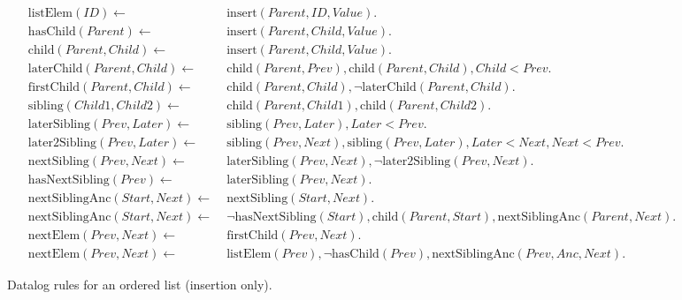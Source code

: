 \documentclass[twocolumn,10pt]{article}
\begin{document}
\begin{figure*}
\begin{align*}
    \mathrm{listElem}(\mathit{ID}) \leftarrow\; &
    \mathrm{insert}(\mathit{Parent}, \mathit{ID}, \mathit{Value}).
\\
    \mathrm{hasChild}(\mathit{Parent}) \leftarrow\; &
    \mathrm{insert}(\mathit{Parent}, \mathit{Child}, \mathit{Value}).
\\
    \mathrm{child}(\mathit{Parent}, \mathit{Child}) \leftarrow\; &
    \mathrm{insert}(\mathit{Parent}, \mathit{Child}, \mathit{Value}).
\\
    \mathrm{laterChild}(\mathit{Parent}, \mathit{Child}) \leftarrow\; &
    \mathrm{child}(\mathit{Parent}, \mathit{Prev}),
    \mathrm{child}(\mathit{Parent}, \mathit{Child}),
    \mathit{Child} < \mathit{Prev}.
\\
    \mathrm{firstChild}(\mathit{Parent}, \mathit{Child}) \leftarrow\; &
    \mathrm{child}(\mathit{Parent}, \mathit{Child}),
    \neg\mathrm{laterChild}(\mathit{Parent}, \mathit{Child}).
\\
    \mathrm{sibling}(\mathit{Child1}, \mathit{Child2}) \leftarrow\; &
    \mathrm{child}(\mathit{Parent}, \mathit{Child1}),
    \mathrm{child}(\mathit{Parent}, \mathit{Child2}).
\\
    \mathrm{laterSibling}(\mathit{Prev}, \mathit{Later}) \leftarrow\; &
    \mathrm{sibling}(\mathit{Prev}, \mathit{Later}),
    \mathit{Later} < \mathit{Prev}.
\\
    \mathrm{later2Sibling}(\mathit{Prev}, \mathit{Later}) \leftarrow\; &
    \mathrm{sibling}(\mathit{Prev}, \mathit{Next}),
    \mathrm{sibling}(\mathit{Prev}, \mathit{Later}),
    \mathit{Later} < \mathit{Next},
    \mathit{Next} < \mathit{Prev}.
\\
    \mathrm{nextSibling}(\mathit{Prev}, \mathit{Next}) \leftarrow\; &
    \mathrm{laterSibling}(\mathit{Prev}, \mathit{Next}),
    \neg\mathrm{later2Sibling}(\mathit{Prev}, \mathit{Next}).
\\
    \mathrm{hasNextSibling}(\mathit{Prev}) \leftarrow\; &
    \mathrm{laterSibling}(\mathit{Prev}, \mathit{Next}).
\\
    \mathrm{nextSiblingAnc}(\mathit{Start}, \mathit{Next}) \leftarrow\; &
    \mathrm{nextSibling}(\mathit{Start}, \mathit{Next}).
\\
    \mathrm{nextSiblingAnc}(\mathit{Start}, \mathit{Next}) \leftarrow\; &
    \neg\mathrm{hasNextSibling}(\mathit{Start}),
    \mathrm{child}(\mathit{Parent}, \mathit{Start}),
    \mathrm{nextSiblingAnc}(\mathit{Parent}, \mathit{Next}).
\\
    \mathrm{nextElem}(\mathit{Prev}, \mathit{Next}) \leftarrow\; &
    \mathrm{firstChild}(\mathit{Prev}, \mathit{Next}).
\\
    \mathrm{nextElem}(\mathit{Prev}, \mathit{Next}) \leftarrow\; &
    \mathrm{listElem}(\mathit{Prev}),
    \neg\mathrm{hasChild}(\mathit{Prev}),
    \mathrm{nextSiblingAnc}(\mathit{Prev}, \mathit{Anc}, \mathit{Next}).
\end{align*}
\caption{Datalog rules for an ordered list (insertion only).}
\end{figure*}

{\footnotesize

{}}
\end{document}
